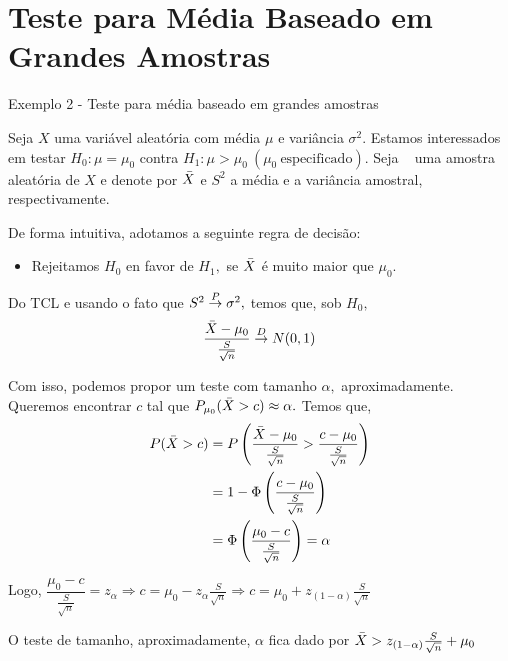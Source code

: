 \documentclass[12pt]{beamer}
\begin{document}
\section{Teste para Média Baseado em Grandes Amostras}
\begin{frame}{Exemplo 2 - Teste para média baseado em grandes amostras}
\begin{block}{}
\justifying
Seja $X$ uma variável aleatória com média $\mu$ e variância $\sigma^{2}.$ Estamos interessados em testar $H_{0}:\mu=\mu_{0}$ contra $H_{1}:\mu>\mu_{0}~(\mu_{0}~\text{especificado}).$ Seja \seqX~ uma amostra aleatória de $X$ e denote por $\Bar{X}$ e $S^{2}$ a média e a variância amostral, respectivamente.
\end{block}
\pause
\begin{block}{}
\justifying
De forma intuitiva, adotamos a seguinte regra de decisão:
\begin{itemize}
    \item Rejeitamos $H_{0}$ en favor de $H_{1},$ se $\Bar{X}$ é muito maior que $\mu_{0}.$
\end{itemize}
\end{block}
\end{frame}

\begin{frame}{}
\begin{block}{}
\justifying
Do TCL e usando o fato que $S^{2}\overset{P}{\rightarrow} \sigma^{2},$ temos que, sob $H_{0},$ \[\dfrac{\Bar{X}-\mu_{0}}{\frac{S}{\sqrt{n}}}\overset{D}{\rightarrow} N(0,1)\]
\end{block}
\pause
\begin{block}{}
\justifying
Com isso, podemos propor um teste com tamanho $\alpha,$ aproximadamente. Queremos encontrar $c$ tal que $P_{\mu_{0}}(\Bar{X}>c)\approx\alpha.$ Temos que,
\begin{align*}
    P(\Bar{X}>c)&=P\left(\dfrac{\Bar{X}-\mu_{0}}{\frac{S}{\sqrt{n}}}>\dfrac{c-\mu_{0}}{\frac{S}{\sqrt{n}}}\right)\\
    &=1-\Phi\left(\frac{c-\mu_{0}}{\frac{S}{\sqrt{n}}}\right)\\
    &=\Phi\left(\frac{\mu_{0}-c}{\frac{S}{\sqrt{n}}}\right)=\alpha
\end{align*}
\end{block}
\end{frame}

\begin{frame}{}
\begin{block}{}
\justifying
Logo, $\dfrac{\mu_{0}-c}{\frac{S}{\sqrt{n}}}=z_{\alpha}\Rightarrow c=\mu_{0}-z_{\alpha}\frac{S}{\sqrt{n}}\Rightarrow c=\mu_{0}+z_{(1-\alpha)}\frac{S}{\sqrt{n}}$
\end{block}
\pause
\begin{block}{}
\justifying
O teste de tamanho, aproximadamente, $\alpha$ fica dado por $\Bar{X}>z_{(1-\alpha)}\frac{S}{\sqrt{n}}+\mu_{0}$
\end{block}
\end{frame}
\end{document}
